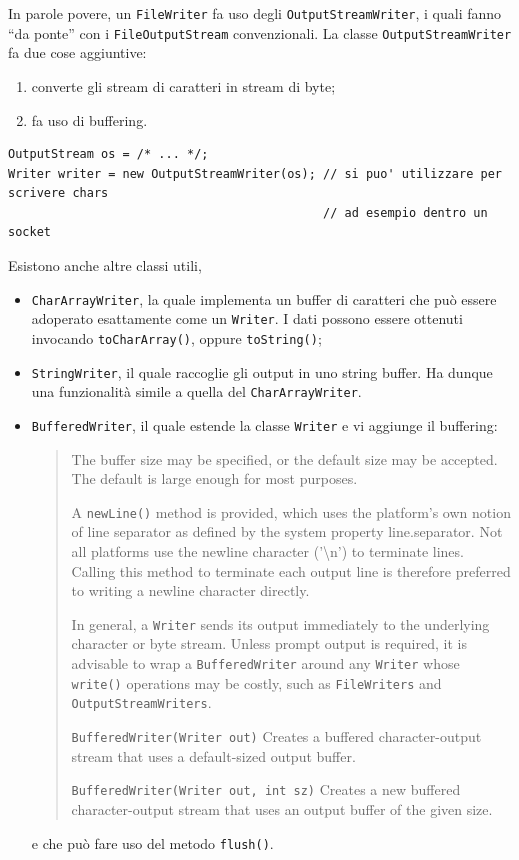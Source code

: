 \documentclass[\fontsizeclass,twocolumn]{\classname}
\theoremstyle{definition}
\theoremstyle{definition}
\begin{document}
In parole povere, un \texttt{FileWriter} fa uso degli
\texttt{OutputStreamWriter}, i quali fanno ``da ponte'' con i
\texttt{FileOutputStream} convenzionali. La classe \texttt{OutputStreamWriter}
fa due cose aggiuntive:

\begin{enumerate}
    \item converte gli stream di caratteri in stream di byte;
    \item fa uso di buffering.
\end{enumerate}

\begin{lstlisting}
OutputStream os = /* ... */;
Writer writer = new OutputStreamWriter(os); // si puo' utilizzare per scrivere chars
                                            // ad esempio dentro un socket
\end{lstlisting}

Esistono anche altre classi utili,
\begin{itemize}
    \item \texttt{CharArrayWriter}, la quale implementa un buffer di caratteri
        che può essere adoperato esattamente come un \texttt{Writer}. I dati
        possono essere ottenuti invocando \texttt{toCharArray()}, oppure
        \texttt{toString()};
    \item \texttt{StringWriter}, il quale raccoglie gli output in uno string
        buffer. Ha dunque una funzionalità simile a quella del
        \texttt{CharArrayWriter}.
    \item \texttt{BufferedWriter}, il quale estende la classe \texttt{Writer} e
        vi aggiunge il buffering:
\begin{quote}
    \footnotesize{The buffer size may be specified, or the default size may be accepted. The default is large enough for most purposes.

        A \texttt{newLine()} method is provided, which uses the platform's own notion of line separator as defined by the system property line.separator. Not all platforms use the newline character ('\textbackslash n') to terminate lines. Calling this method to terminate each output line is therefore preferred to writing a newline character directly.

        In general, a \texttt{Writer} sends its output immediately to the underlying character or byte stream. Unless prompt output is required, it is advisable to wrap a \texttt{BufferedWriter} around any \texttt{Writer} whose \texttt{write()} operations may be costly, such as \texttt{FileWriters} and \texttt{OutputStreamWriters}.

\texttt{BufferedWriter(Writer out)} 	Creates a buffered character-output
stream that uses a default-sized output buffer.

\texttt{BufferedWriter(Writer out, int sz)} 	Creates a new buffered
character-output stream that uses an output buffer of the given size.}
\end{quote}
e che può fare uso del metodo \texttt{flush()}.
\end{itemize}
\end{document}
